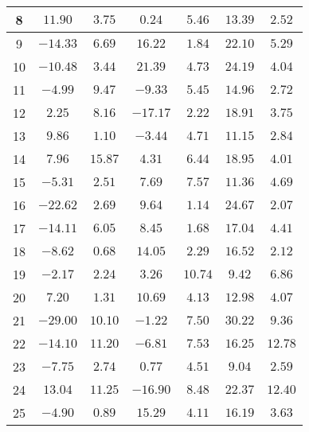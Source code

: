 \begin{table}[H]
\begin{tabular}{|c|c|c|c|c|c|c|}
                    8      & $11.90$     &$3.75$   &  $0.24$   &  $5.46$  & $13.39$  & $2.52$  \\ \hline
                    9      & $-14.33$    &$6.69$   &  $16.22$  & $1.84$   & $22.10$  & $5.29$  \\ \hline
                    10     & $-10.48$    &$3.44$   &  $21.39$  & $4.73$   & $24.19$  & $4.04$  \\ \hline
                    11     & $-4.99$     &$9.47$   &  $-9.33$  & $5.45$   & $14.96$  & $2.72$  \\ \hline
                    12     & $2.25$      &$8.16$   &  $-17.17$ &  $2.22$  & $18.91$  & $3.75$  \\ \hline
                    13     & $9.86$      &$1.10$   &  $-3.44$  & $4.71$   & $11.15$  & $2.84$  \\ \hline
                    14     & $7.96$      &$15.87$  &  $4.31$   & $6.44$   & $18.95$  & $4.01$  \\ \hline
                    15     & $-5.31$     &$2.51$   &  $7.69$   & $7.57$   & $11.36$  & $4.69$  \\ \hline
                    16     & $-22.62$    &$2.69$   &  $9.64$   & $1.14$   & $24.67$  & $2.07$  \\ \hline
                    17     & $-14.11$    &$6.05$   &  $8.45$   & $1.68$   & $17.04$  & $4.41$  \\ \hline
                    18     & $-8.62$     &$0.68$   &  $14.05$  & $2.29$   & $16.52$  & $2.12$  \\ \hline
                    19     & $-2.17$     &$2.24$   &  $3.26$   & $10.74$  & $9.42$   & $6.86$  \\ \hline
                    20     & $7.20$      &$1.31$   &  $10.69$  & $4.13$   & $12.98$  & $4.07$  \\ \hline
                    21     & $-29.00$    &$10.10$  &  $-1.22$  & $7.50$   & $30.22$  & $9.36$  \\ \hline
                    22     & $-14.10$    &$11.20$  &  $-6.81$  & $7.53$   & $16.25$  & $12.78$ \\ \hline
                    23     & $-7.75$     &$2.74$   &  $0.77$   & $4.51$   & $9.04$   & $2.59$  \\ \hline
                    24     & $13.04$     &$11.25$  &  $-16.90$ & $8.48$   & $22.37$  & $12.40$ \\ \hline
                    25     & $-4.90$     &$0.89$   &  $15.29$  & $4.11$   & $16.19$  & $3.63$  \\ \hline

\end{tabular}
\end{table}
